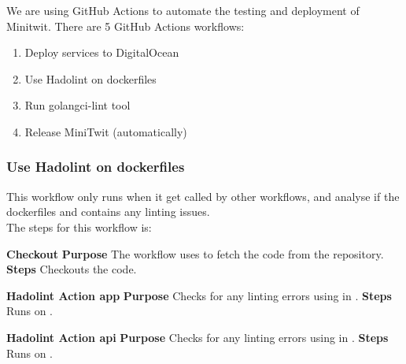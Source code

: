 We are using GitHub Actions to automate the testing and deployment of Minitwit. There are 5 GitHub Actions workflows:
\begin{enumerate}
    \item Deploy services to DigitalOcean
    \item Use Hadolint on dockerfiles
    \item Run golangci-lint tool
    \item Release MiniTwit (automatically)
\end{enumerate}

\subsubsection{Use Hadolint on dockerfiles}
This workflow only runs when it get called by other workflows, and analyse if the dockerfiles  and  contains any linting issues.\\
The steps for this workflow is:
\begin{outline}[enumerate]
    \1 \textbf{Checkout}
        \2 \textbf{Purpose} 
            \3 The workflow uses  to fetch the code from the repository.
        \2 \textbf{Steps}
            \3 Checkouts the code.

        
    \1 \textbf{Hadolint Action app}
        \2 \textbf{Purpose}
            \3 Checks for any linting errors using  in .
        \2 \textbf{Steps}
            \3 Runs  on .
    
        
    \1 \textbf{Hadolint Action api}
        \2 \textbf{Purpose}
            \3 Checks for any linting errors using  in .
        \2 \textbf{Steps}
            \3 Runs  on .
\end{outline}


